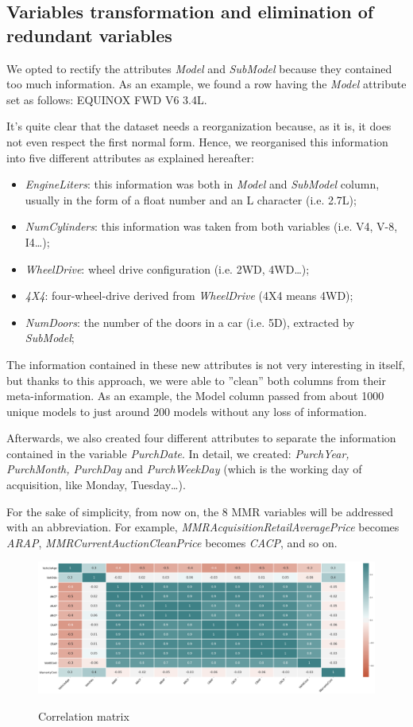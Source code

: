 \documentclass{article}
\begin{document}
	\subsection{Variables transformation and elimination of redundant variables}
	We opted to rectify the attributes \emph{Model} and \emph{SubModel} because they contained too much information. As an example, we found a row having the \emph{Model} attribute set as follows: EQUINOX FWD V6 3.4L. 
	
	It's quite clear that the dataset needs a reorganization because, as it is, it does not even respect the first normal form. Hence, we reorganised this information into five different attributes as explained hereafter:
	\begin{itemize}
		\item \emph{EngineLiters}: this information was both in \emph{Model} and \emph{SubModel} column, usually in the form of a float number and an L character (i.e. 2.7L);
		\item \emph{NumCylinders}: this information was taken from both variables (i.e. V4, V-8, I4\dots);
		\item \emph{WheelDrive}: wheel drive configuration (i.e. 2WD, 4WD\dots);
		\item \emph{4X4}: four-wheel-drive derived from \emph{WheelDrive} (4X4 means 4WD);
		\item \emph{NumDoors}: the number of the doors in a car (i.e. 5D), extracted by \emph{SubModel};
	\end{itemize}
	
	The information contained in these new attributes is not very interesting in itself, but thanks to this approach, we were able to ”clean” both columns from their meta-information. As an example, the Model column passed from about 1000 unique models to just around 200 models without any loss of information. 
	
	Afterwards, we also created four different attributes to separate the information contained in the variable \emph{PurchDate}. In detail, we created: \emph{PurchYear, PurchMonth, PurchDay} and \emph{PurchWeekDay} (which is the working day of acquisition, like Monday, Tuesday\dots).
	
	For the sake of simplicity, from now on, the 8 MMR variables will be addressed with an abbreviation. For example, \emph{MMRAcquisitionRetailAveragePrice} becomes \emph{ARAP}, \emph{MMRCurrentAuctionCleanPrice} becomes \emph{CACP}, and so on.
	
	
	\begin{figure}[H]
		\centering
		{\includegraphics[width=\textwidth]{corr.png}}
		\caption{{ Correlation matrix }}
		\label{fig:corr}
	\end{figure}
	
\end{document}
